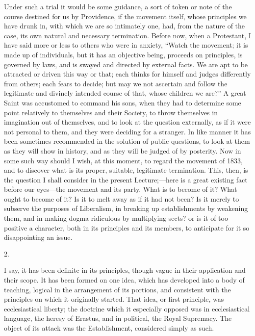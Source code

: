 Under such a trial it would be some guidance, a sort of token or
note of the course destined for us by Providence, if the movement
itself, whose principles we have drunk in, with which we are so
intimately one, had, from the nature of the case, its own natural and
necessary termination. Before now, when a Protestant, I have said more
or less to others who were in anxiety, ``Watch the movement; it is
made up of individuals, but it has an objective being, proceeds on
principles, is governed by laws, and is swayed and directed by
external facts. We are apt to be attracted or driven this way or that;
each thinks for himself and judges differently from others; each fears
to decide; but may we not ascertain and follow the legitimate and
divinely intended course of that, whose children we are?'' A great
Saint was accustomed to command his sons, when they had to determine
some point relatively to themselves and their Society, to throw
themselves in imagination out of themselves, and to look at the
question externally, as if it were not personal to them, and they were
deciding for a stranger. In like manner it has been sometimes
recommended in the solution of public questions, to look at them as
they will show in history, and as they will be judged of by posterity.
Now in some such way should I wish, at this moment, to regard the
movement of 1833, and to discover what is its proper, suitable,
legitimate termination. This, then, is the question I shall consider
in the present Lecture;—here is a great existing fact before our
eyes—the movement and its party. What is to become of it? What ought
to become of it? Is it to melt away as if it had not been? Is it
merely to subserve the purposes of Liberalism, in breaking up
establishments by weakening them, and in making dogma ridiculous by
multiplying sects? or is it of too positive a character, both in its
principles and its members, to anticipate for it so disappointing an
issue.

2.

I say, it has been definite in its principles, though vague in
their application and their scope. It has been formed on one idea,
which has developed into a body of teaching, logical in the
arrangement of its portions, and consistent with the principles on
which it originally started. That idea, or first principle, was
ecclesiastical liberty; the doctrine which it especially opposed was
in ecclesiastical language, the heresy of Erastus, and in political,
the Royal Supremacy. The object of its attack was the Establishment,
considered simply as such.

